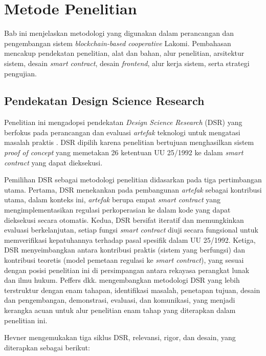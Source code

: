 \chapter{Metode Penelitian}
\label{ch3}

Bab ini menjelaskan metodologi yang digunakan dalam perancangan dan pengembangan sistem \textit{blockchain-based cooperative} Lakomi. Pembahasan mencakup pendekatan penelitian, alat dan bahan, alur penelitian, arsitektur sistem, desain \textit{smart contract}, desain \textit{frontend}, alur kerja sistem, serta strategi pengujian.

\section{Pendekatan Design Science Research}

Penelitian ini mengadopsi pendekatan \textit{Design Science Research} (DSR) yang berfokus pada perancangan dan evaluasi \textit{artefak} teknologi untuk mengatasi masalah praktis \cite{hevner2004design}. DSR dipilih karena penelitian bertujuan menghasilkan sistem \textit{proof of concept} yang memetakan 26 ketentuan UU 25/1992 ke dalam \textit{smart contract} yang dapat dieksekusi.

Pemilihan DSR sebagai metodologi penelitian didasarkan pada tiga pertimbangan utama. Pertama, DSR menekankan pada pembangunan \textit{artefak} sebagai kontribusi utama, dalam konteks ini, \textit{artefak} berupa empat \textit{smart contract} yang mengimplementasikan regulasi perkoperasian ke dalam kode yang dapat dieksekusi secara otomatis. Kedua, DSR bersifat iteratif dan memungkinkan evaluasi berkelanjutan, setiap fungsi \textit{smart contract} diuji secara fungsional untuk memverifikasi kepatuhannya terhadap pasal spesifik dalam UU 25/1992. Ketiga, DSR menyeimbangkan antara kontribusi praktis (sistem yang berfungsi) dan kontribusi teoretis (model pemetaan regulasi ke \textit{smart contract}), yang sesuai dengan posisi penelitian ini di persimpangan antara rekayasa perangkat lunak dan ilmu hukum. Peffers dkk. \cite{peffers2007design} mengembangkan metodologi DSR yang lebih terstruktur dengan enam tahapan, identifikasi masalah, penetapan tujuan, desain dan pengembangan, demonstrasi, evaluasi, dan komunikasi, yang menjadi kerangka acuan untuk alur penelitian enam tahap yang diterapkan dalam penelitian ini.

Hevner \cite{hevner2007design} mengemukakan tiga siklus DSR, relevansi, rigor, dan desain, yang diterapkan sebagai berikut:

